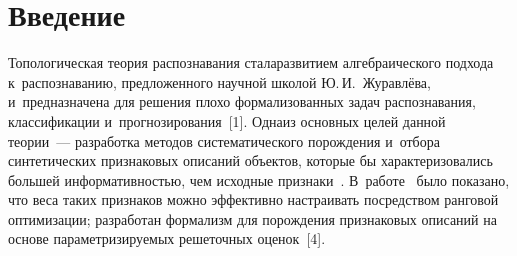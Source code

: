 
  



\thispagestyle{headings}

\begin{multicols}{2}

\label{st\stat}

\section{Введение}

    Топологическая теория распознавания стала\linebreak развитием алгебраического 
подхода к~распознаванию, предложенного научной школой Ю.\,И.~Жу\-равлё\-ва, 
и~предназначена для решения плохо формализованных задач распознавания, 
\mbox{классификации} и~прогнозирования~[1]. Одна\linebreak из основных целей данной тео\-рии~--- 
разработка методов систематического порождения и~отбора \mbox{синтетических} 
признаковых описаний объектов, которые бы характеризовались большей 
информативностью, чем исходные признаки~\cite{2-tr}. В~работе~\cite{3-tr} 
было показано, что веса таких признаков можно эффективно настраивать 
посредством ранговой оптимизации; разработан формализм для по\-рож\-де\-ния 
признаковых описаний на основе па\-ра\-мет\-ри\-зи\-ру\-емых решеточных оценок~[4].
     

\end{multicols}
